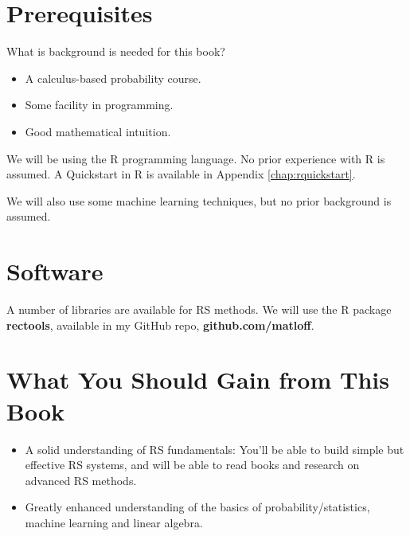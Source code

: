 \section{Prerequisites}

What is background is needed for this book?

\begin{itemize}

\item A calculus-based probability course.

\item Some facility in programming.  

\item Good mathematical intuition.

\end{itemize} 

We will be using the R programming language.  No prior experience with R
is assumed.  A Quickstart in R is available in Appendix
\ref{chap:rquickstart}.

We will also use some machine learning techniques, but no prior
background is assumed.

\section{Software}

A number of libraries are available for RS methods.  We will use the R
package \textbf{rectools}, available in my GitHub repo,
\textbf{github.com/matloff}.

\section{What You Should Gain from This Book}

\begin{itemize}

\item A solid understanding of RS fundamentals:  You'll be able to build
simple but effective RS systems, and will be able to read books and
research on advanced RS methods.

\item Greatly enhanced understanding of the basics of
probability/statistics, machine learning and linear algebra.

\end{itemize} 

